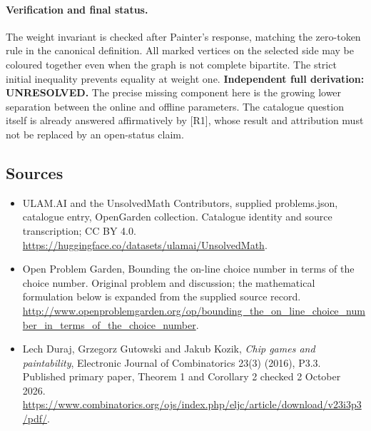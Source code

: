 \documentclass[11pt,a4paper]{article}
\begin{document}
\paragraph{Verification and final status.}
The weight invariant is checked after Painter's response, matching the
zero-token rule in the canonical definition. All marked vertices on
the selected side may be coloured together even when the graph is
not complete bipartite. The strict initial inequality prevents equality
at weight one. \textbf{Independent full derivation: UNRESOLVED.}
The precise missing component here is the growing lower separation
between the online and offline parameters. The catalogue question
itself is already answered affirmatively by [R1], whose result and
attribution must not be replaced by an open-status claim.

\subsection{Sources}
\begin{itemize}
\item[S1] ULAM.AI and the UnsolvedMath Contributors, supplied problems.json, catalogue entry, OpenGarden collection. Catalogue identity and source transcription; CC BY 4.0.
\url{https://huggingface.co/datasets/ulamai/UnsolvedMath}.
\item[S2] Open Problem Garden, Bounding the on-line choice number in terms of the choice number. Original problem and discussion; the mathematical formulation below is expanded from the supplied source record.
\url{http://www.openproblemgarden.org/op/bounding_the_on_line_choice_number_in_terms_of_the_choice_number}.

\item[R1] Lech Duraj, Grzegorz Gutowski and Jakub Kozik,
\emph{Chip games and paintability}, Electronic Journal of Combinatorics
23(3) (2016), P3.3. Published primary paper, Theorem 1 and Corollary 2
checked 2 October 2026.
\url{https://www.combinatorics.org/ojs/index.php/eljc/article/download/v23i3p3/pdf/}.

\end{itemize}
\end{document}
